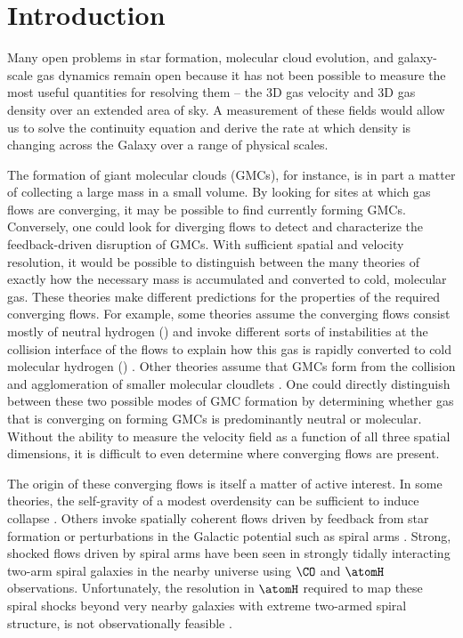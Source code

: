 \section{Introduction}
Many open problems in star formation, molecular cloud evolution, and galaxy-scale gas dynamics remain open because it has not been possible to measure the most useful quantities for resolving them -- the 3D gas velocity and 3D gas density over an extended area of sky. A measurement of these fields would allow us to solve the continuity equation \citep{euler1757principes} and derive the rate at which density is changing across the Galaxy over a range of physical scales. 

The formation of giant molecular clouds (GMCs), for instance, is in part a matter of collecting a large mass in a small volume. 
By looking for sites at which gas flows are converging, it may be possible to find currently forming GMCs.
Conversely, one could look for diverging flows to detect and characterize the feedback-driven disruption of GMCs.
With sufficient spatial and velocity resolution, it would be possible to distinguish between the many theories of exactly how the necessary mass is accumulated and converted to cold, molecular gas. 
These theories make different predictions for the properties of the required converging flows. 
For example, some theories assume the converging flows consist mostly of neutral hydrogen (\atomH) and invoke different sorts of instabilities at the collision interface of the flows to explain how this gas is rapidly converted to cold molecular hydrogen (\molH) \citep[e.g. ][]{Heitsch06,Clark:2012bq,2014ApJ...790...37C}.
Other theories assume that GMCs form from the collision and agglomeration of smaller molecular cloudlets \citep[e.g. ][]{Roberts:1987eb,Dobbs:2008ez,Tasker:2009gc}. 
One could directly distinguish between these two possible modes of GMC formation by determining whether gas that is converging on forming GMCs is predominantly neutral or molecular.
Without the ability to measure the velocity field as a function of all three spatial dimensions, it is difficult to even determine where converging flows are present.

The origin of these converging flows is itself a matter of active interest.
In some theories, the self-gravity of a modest overdensity can be sufficient to induce collapse \citep{Kim:2002da,VazquezSemadeni:2007cj,2012MNRAS.425.2157D}.
Others invoke spatially coherent flows driven by feedback from star formation \citep{Fujimoto:2014kh} or perturbations in the Galactic potential such as spiral arms \citep{Roberts:1972bp,Bonnell:2006hn}.
Strong, shocked flows driven by spiral arms have been seen in strongly tidally interacting two-arm spiral galaxies in the nearby universe \citep{Visser:1980vc,Visser:1980ud,Shetty_2007} using $\CO$ and $\atomH$ observations.
Unfortunately, the resolution in $\atomH$ required to map these spiral shocks beyond very nearby galaxies with extreme two-armed spiral structure, is not observationally feasible \citep{Visser:1980ud}.

